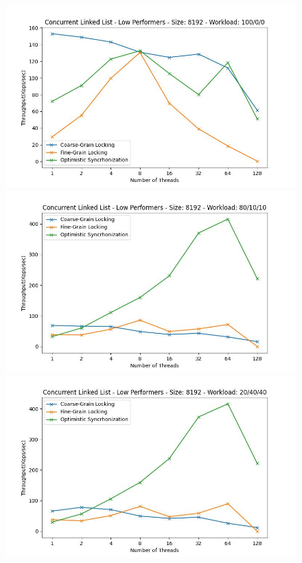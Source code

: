 \documentclass[../final_report.tex]{subfiles}
\begin{document}
\begin{figure}[H]
    \centering
        \includegraphics[scale=0.4]{outFiles/plots/concurrent_data_structs_low_8192_100_0_0.jpg}
        \includegraphics[scale=0.4]{outFiles/plots/concurrent_data_structs_low_8192_80_10_10.jpg}
        \includegraphics[scale=0.4]{outFiles/plots/concurrent_data_structs_low_8192_20_40_40.jpg}

\end{figure}
\end{document}
